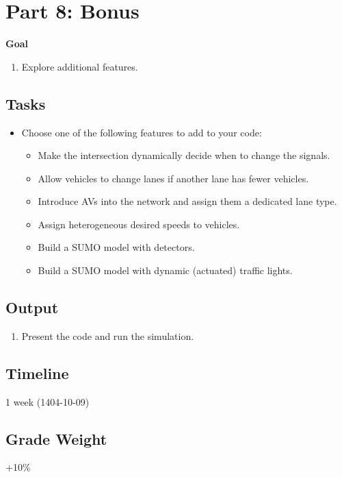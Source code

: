 \documentclass{KPS_assignment}
\begin{document}
\maketitle

\section*{Part 8: Bonus}

\textbf{Goal}
\begin{enumerate}
\item Explore additional features.
\end{enumerate}

\subsection*{Tasks}
\begin{itemize}
  \item Choose one of the following features to add to your code:
  \begin{itemize}
    \item Make the intersection dynamically decide when to change the signals.
    \item Allow vehicles to change lanes if another lane has fewer vehicles.
    \item Introduce AVs into the network and assign them a dedicated lane type.
    \item Assign heterogeneous desired speeds to vehicles.
    \item Build a SUMO model with detectors.
    \item Build a SUMO model with dynamic (actuated) traffic lights.
  \end{itemize}
\end{itemize}

\subsection*{Output}
\begin{enumerate}
\item Present the code and run the simulation.
\end{enumerate}

\subsection*{Timeline}
1 week (1404-10-09)

\subsection*{Grade Weight}
+10\%
\end{document}
